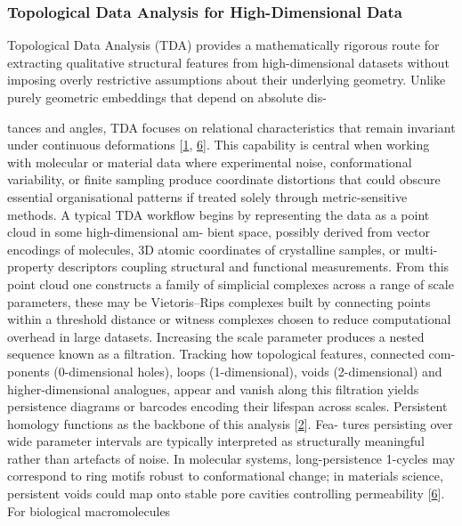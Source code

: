 \documentclass[
]{article}
\begin{document}
\hypertarget{topological-data-analysis-for-high-dimensional-data}{%
\subsubsection{Topological Data Analysis for High-Dimensional
Data}\label{topological-data-analysis-for-high-dimensional-data}}

Topological Data Analysis (TDA) provides a mathematically rigorous route
for extracting qualitative structural features from high-dimensional
datasets without imposing overly restrictive assumptions about their
underlying geometry. Unlike purely geometric embeddings that depend on
absolute dis-

tances and angles, TDA focuses on relational characteristics that remain
invariant under continuous deformations
{[}\protect\hyperlink{_bookmark41}{1},
\protect\hyperlink{_bookmark46}{6}{]}. This capability is central when
working with molecular or material data where experimental noise,
conformational variability, or finite sampling produce coordinate
distortions that could obscure essential organisational patterns if
treated solely through metric-sensitive methods. A typical TDA workflow
begins by representing the data as a point cloud in some
high-dimensional am- bient space, possibly derived from vector encodings
of molecules, 3D atomic coordinates of crystalline samples, or
multi-property descriptors coupling structural and functional
measurements. From this point cloud one constructs a family of
simplicial complexes across a range of scale parameters, these may be
Vietoris--Rips complexes built by connecting points within a threshold
distance or witness complexes chosen to reduce computational overhead in
large datasets. Increasing the scale parameter produces a nested
sequence known as a filtration. Tracking how topological features,
connected com- ponents (0-dimensional holes), loops (1-dimensional),
voids (2-dimensional) and higher-dimensional analogues, appear and
vanish along this filtration yields persistence diagrams or barcodes
encoding their lifespan across scales. Persistent homology functions as
the backbone of this analysis {[}\protect\hyperlink{_bookmark42}{2}{]}.
Fea- tures persisting over wide parameter intervals are typically
interpreted as structurally meaningful rather than artefacts of noise.
In molecular systems, long-persistence 1-cycles may correspond to ring
motifs robust to conformational change; in materials science, persistent
voids could map onto stable pore cavities controlling permeability
{[}\protect\hyperlink{_bookmark46}{6}{]}. For biological macromolecules
\end{document}
